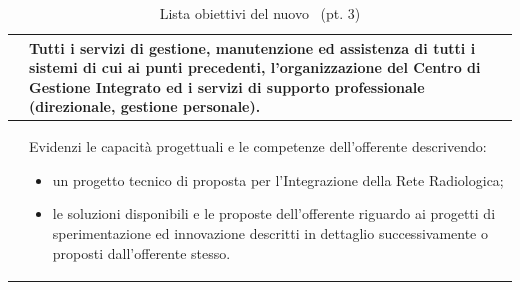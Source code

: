 \begin{table}[H]
\begin{tabular}{|>{\raggedright\arraybackslash}m{2cm}|m{10cm}|}
			\codiceobiettivo & Tutti i servizi di gestione, manutenzione ed assistenza di tutti i sistemi di cui ai punti precedenti, l’organizzazione del Centro di Gestione Integrato ed i servizi di supporto professionale (direzionale, gestione personale).
			\\\hline
			
			\codiceobiettivo & Evidenzi le capacità progettuali e le competenze dell’offerente descrivendo:
			\begin{itemize}[noitemsep]
				\item un progetto tecnico di proposta per l’Integrazione della Rete Radiologica;
				\item le soluzioni disponibili e le proposte dell’offerente riguardo ai progetti di sperimentazione ed innovazione descritti in dettaglio successivamente o proposti dall’offerente stesso.
			\end{itemize}
			\\\hline
	
		\end{tabular}
		\renewcommand\arraystretch{1}
		\caption{Lista obiettivi del nuovo \helpdesk~(pt. 3)}
	\end{table}	

